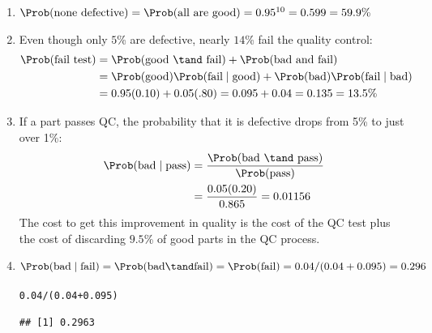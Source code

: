 \documentclass[twoside]{book}\usepackage[]{graphicx}\usepackage[]{xcolor}
\makeatletter
\newcommand{\hlnum}[1]{\textcolor[rgb]{0.686,0.059,0.569}{#1}}%
\newcommand{\hlopt}[1]{\textcolor[rgb]{0,0,0}{#1}}%
\newcommand{\hlstd}[1]{\textcolor[rgb]{0.345,0.345,0.345}{#1}}%
\newenvironment{kframe}{%
 \def\at@end@of@kframe{}%
 \ifinner\ifhmode%
  \def\at@end@of@kframe{\end{minipage}}%
  \begin{minipage}{\columnwidth}%
 \fi\fi%
 \def\FrameCommand##1{\hskip\@totalleftmargin \hskip-\fboxsep
 \colorbox{shadecolor}{##1}\hskip-\fboxsep
     \hskip-\linewidth \hskip-\@totalleftmargin \hskip\columnwidth}%
 \MakeFramed {\advance\hsize-\width
   \@totalleftmargin\z@ \linewidth\hsize
   \@setminipage}}%
 {\par\unskip\endMakeFramed%
 \at@end@of@kframe}
\newenvironment{knitrout}{}{} %
\makeatother
\begin{document}
\begin{solution}
\begin{enumerate}
\item
$\Prob(\mbox{none defective}) = \Prob(\mbox{all are good}) = 
0.95^{10} = 0.599 = 59.9\%$
\item
Even though only $5$\% are defective, nearly $14$\% fail the quality control:
\begin{align*}
\Prob(\mbox{fail test}) 
&= \Prob(\mbox{good \tand fail}) + \Prob(\mbox{bad and fail}) 
\\
& = \Prob(\mbox{good}) \Prob(\mbox{fail}\mid \mbox{good}) 
	+ \Prob(\mbox{bad}) \Prob(\mbox{fail}\mid \mbox{bad}) 
	\\
&= 0.95 (0.10) + 0.05 (.80) = 0.095 + 0.04 = 0.135 = 13.5\%
\end{align*}
\item
If a part passes QC, the probability that it is defective
drops from 5\% to just over 1\%:  
\begin{align*}
\Prob(\mbox{bad} \mid \mbox{pass}) 
&= \frac{ \Prob(\mbox{bad \tand pass})}{\Prob(\mbox{pass})}
\\
& = 
\frac{ 0.05 (0.20) }{ 0.865 }
=
0.01156
\end{align*}
The cost to get this improvement 
in quality is the cost of the QC test plus the cost of discarding $9.5$\% of 
good parts in the QC process.  
\item
	\[
	\Prob(\mbox{bad} \mid \mbox{fail}) = 
	\Prob(\mbox{bad} \tand  \mbox{fail}) = 
	\Prob(\mbox{fail})  
	= 0.04 / (0.04 + 0.095)
	= 0.296
	\]
\begin{knitrout}
\color{fgcolor}\begin{kframe}
\begin{alltt}
\hlnum{0.04} \hlopt{/} \hlstd{(}\hlnum{0.04} \hlopt{+} \hlnum{0.095}\hlstd{)}
\end{alltt}
\begin{verbatim}
## [1] 0.2963
\end{verbatim}
\end{kframe}
\end{knitrout}
\end{enumerate}
\end{solution}
\end{document}
